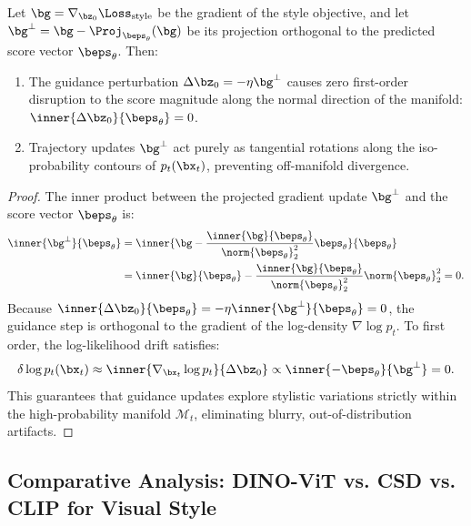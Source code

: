 \begin{theorem}
\label{thm:manifold}
Let $\bg = \nabla_{\bz_0} \Loss_{\text{style}}$ be the gradient of the style objective, and let $\bg^\perp = \bg - \Proj_{\beps_\theta}(\bg)$ be its projection orthogonal to the predicted score vector $\beps_\theta$. Then:
\begin{enumerate}
    \item The guidance perturbation $\Delta \bz_0 = -\eta \bg^\perp$ causes zero first-order disruption to the score magnitude along the normal direction of the manifold: $\inner{\Delta \bz_0}{\beps_\theta} = 0$.
    \item Trajectory updates $\bg^\perp$ act purely as tangential rotations along the iso-probability contours of $p_t(\bx_t)$, preventing off-manifold divergence.
\end{enumerate}
\end{theorem}

\begin{proof}
The inner product between the projected gradient update $\bg^\perp$ and the score vector $\beps_\theta$ is:
\begin{align}
    \inner{\bg^\perp}{\beps_\theta} &= \inner{\bg - \frac{\inner{\bg}{\beps_\theta}}{\norm{\beps_\theta}_2^2} \beps_\theta}{\beps_\theta} \\
    &= \inner{\bg}{\beps_\theta} - \frac{\inner{\bg}{\beps_\theta}}{\norm{\beps_\theta}_2^2} \norm{\beps_\theta}_2^2 = 0.
\end{align}
Because $\inner{\Delta \bz_0}{\beps_\theta} = -\eta \inner{\bg^\perp}{\beps_\theta} = 0$, the guidance step is orthogonal to the gradient of the log-density $\nabla \log p_t$. To first order, the log-likelihood drift satisfies:
\begin{equation}
    \delta \log p_t(\bx_t) \approx \inner{\nabla_{\bx_t} \log p_t}{\Delta \bz_0} \propto \inner{-\beps_\theta}{\bg^\perp} = 0.
\end{equation}
This guarantees that guidance updates explore stylistic variations strictly within the high-probability manifold $\mathcal{M}_t$, eliminating blurry, out-of-distribution artifacts.
\end{proof}

\subsection{Comparative Analysis: DINO-ViT vs. CSD vs. CLIP for Visual Style}
\label{subsec:dino_vs_csd}

